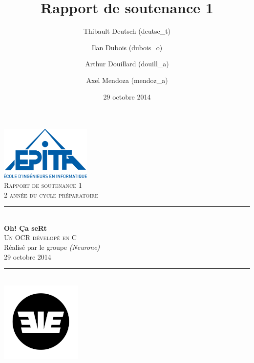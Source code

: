 \documentclass[11pt]{report}
\title{Rapport de soutenance 1}
\author{Thibault Deutsch (deutsc\_t) \and Ilan Dubois (dubois\_o) \and Arthur Douillard (douill\_a) \and Axel Mendoza (mendoz\_a)}
\date{29 octobre 2014}
\begin{document}
\renewcommand{\labelitemi}{$\bullet$}

\begin{titlepage}
\newcommand{\HRule}{\rule{\linewidth}{0.5mm}} %

\flushright
\includegraphics[width = 4.5cm]{epita.png}\\[0.5cm] %

\textsc{\Large Rapport de soutenance 1}\\[0.15cm] %
\textsc{\large 2 année du cycle préparatoire}\\[3cm] %

\center
\HRule \\[0.5cm]
{\Huge \bfseries Oh! Ça seRt}\\[0.3cm] %
\textsc{\Large Un OCR dévelopé en C}\\[0.1cm]
\large Réalisé par le groupe \emph{(Neurone)\up{*}}\\[1.5cm]
\large 29 octobre 2014\\[0.1cm]
\HRule \\[2cm]

\includegraphics[width = 4cm]{eie.png}\\[1cm]


\end{titlepage}
\end{document}
